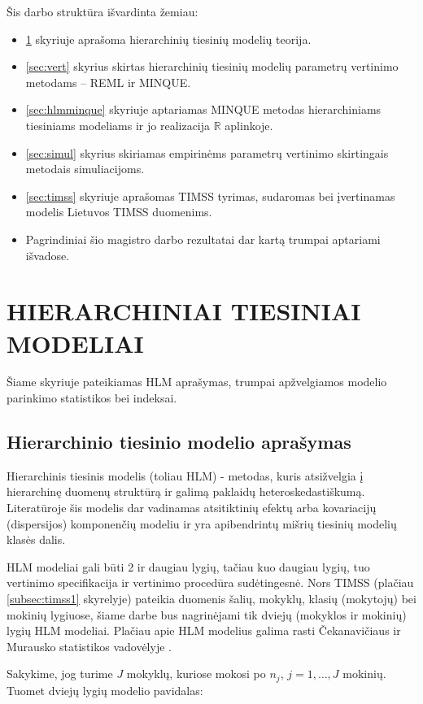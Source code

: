 \documentclass[11pt,a4paper]{article}
\newcommand{\R}{{\mathbb R}}
\begin{document}
\indent Šis darbo struktūra išvardinta žemiau:
\begin{itemize}
\item \ref{sec:hlm} skyriuje aprašoma hierarchinių tiesinių modelių teorija.
\item \ref{sec:vert} skyrius skirtas hierarchinių tiesinių modelių parametrų vertinimo metodams -- REML ir MINQUE.
\item \ref{sec:hlmminque} skyriuje aptariamas MINQUE metodas hierarchiniams tiesiniams modeliams ir jo realizacija $\R$ aplinkoje.
\item \ref{sec:simul} skyrius skiriamas empirinėms parametrų vertinimo skirtingais metodais simuliacijoms.
\item \ref{sec:timss} skyriuje aprašomas TIMSS tyrimas, sudaromas bei įvertinamas modelis Lietuvos TIMSS duomenims.
\item Pagrindiniai šio magistro darbo rezultatai dar kartą trumpai aptariami išvadose.
\end{itemize}

\newpage
\section{HIERARCHINIAI TIESINIAI MODELIAI} \label{sec:hlm}
\indent Šiame skyriuje pateikiamas HLM aprašymas, trumpai apžvelgiamos modelio parinkimo statistikos bei indeksai.

\subsection{Hierarchinio tiesinio modelio aprašymas}
\indent Hierarchinis tiesinis modelis (toliau HLM) - metodas, kuris atsižvelgia į hierarchinę duomenų struktūrą ir galimą paklaidų heteroskedastiškumą. Literatūroje šis modelis dar vadinamas atsitiktinių efektų arba kovariacijų (dispersijos) komponenčių modeliu ir yra apibendrintų mišrių tiesinių modelių klasės dalis\cite{hlmmixed}.

\indent HLM modeliai gali būti 2 ir daugiau lygių, tačiau kuo daugiau lygių, tuo vertinimo specifikacija ir vertinimo procedūra sudėtingesnė. Nors TIMSS (plačiau \ref{subsec:timss1} skyrelyje) pateikia duomenis šalių, mokyklų, klasių (mokytojų) bei mokinių lygiuose, šiame darbe bus nagrinėjami tik dviejų (mokyklos ir mokinių) lygių HLM modeliai. Plačiau apie HLM modelius galima rasti Čekanavičiaus ir Murausko statistikos vadovėlyje \cite{cek}.

\indent Sakykime, jog turime $J$ mokyklų, kuriose mokosi po $n_j$, $j = 1,\dots,J$ mokinių. Tuomet dviejų lygių modelio pavidalas:
\end{document}
